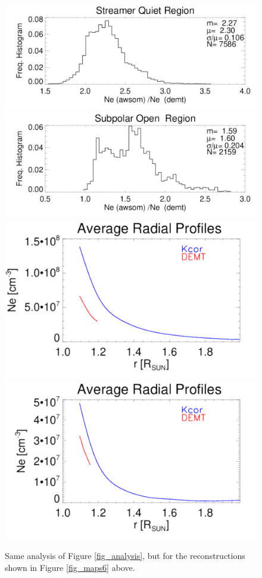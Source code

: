 \documentclass[baaa]{baaa}
\begin{document}
\begin{figure}[!h]
  \centering
  \includegraphics[width=\columnwidth]{comparison_KCOR-Tom_vs_DEMT_CR2198_h_l799_reduced_kcor_1e4_newgrid-Quiet-region1_ratio_range1105-1195_Rsun.pdf}
  \includegraphics[width=\columnwidth]{comparison_KCOR-Tom_vs_DEMT_CR2198_h_l799_reduced_kcor_1e4_newgrid-Open-region_N_ratio_range1105-1155_Rsun.pdf}\\
  \includegraphics[width=0.75\columnwidth]{Average_Radial_Profiles_KCOR-Tom_vs_DEMT_CR2198_h_l799_reduced_kcor_1e4_newgrid-Quiet-region1.pdf}
  \hskip 2cm
  \includegraphics[width=0.75\columnwidth]{Average_Radial_Profiles_KCOR-Tom_vs_DEMT_CR2198_h_l799_reduced_kcor_1e4_newgrid-Open-region_N.pdf}
  \caption{Same analysis of Figure \ref{fig_analysis}, but for the reconstructions shown in Figure \ref{fig_maps6} above.}
  \label{fig_analysis6}
\end{figure}
\end{document}
